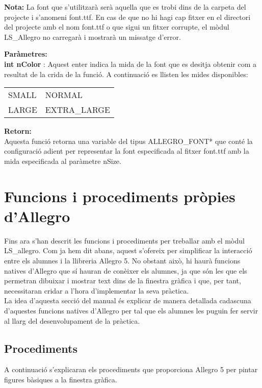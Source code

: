 \documentclass[11pt]{article}
\begin{document}
\noindent \textbf{Nota:} La font que s'utilitzarà serà aquella que es trobi dins de la carpeta del projecte i s'anomeni font.ttf. En cas de que no hi hagi cap fitxer en el directori del projecte amb el nom font.ttf o que sigui un fitxer corrupte, el mòdul LS\_Allegro no carregarà i mostrarà un missatge d'error.
	
\noindent \textbf{Paràmetres:}\\
\textbf{int nColor} : Aquest enter indica la mida de la font que es desitja obtenir com a resultat de la crida de la funció. A continuació es llisten les mides disponibles:

\begin{center}
	\begin{tabular}{l|l}
		SMALL & NORMAL\\
		LARGE & EXTRA\_LARGE\\	
	\end{tabular}
\end{center}

\noindent \textbf{Retorn:}\\
Aquesta funció retorna una variable del tipus ALLEGRO\_FONT* que conté la configuració adient per representar la font especificada al fitxer font.ttf amb la mida especificada al paràmetre nSize.
   	
\newpage
\section{Funcions i procediments pròpies d'Allegro}
Fins ara s'han descrit les funcions i procediments per treballar amb el mòdul LS\_allegro. Com ja hem dit abans, aquest s'ofereix per simplificar la interacció entre els alumnes i la llibreria Allegro 5. No obstant això, hi haurà funcions natives d'Allegro que sí hauran de conèixer els alumnes, ja que són les que els permetran dibuixar i mostrar text dins de la finestra gràfica i que, per tant, necessitaran cridar a l'hora d'implementar la seva pràctica. \\

\noindent La idea d'aquesta secció del manual és explicar de manera detallada cadascuna d'aquestes funcions natives d'Allegro per tal que els alumnes les puguin fer servir al llarg del desenvolupament de la pràctica.
\subsection{Procediments}
A continuació s'explicaran els procediments que proporciona Allegro 5 per pintar figures bàsiques a la finestra gràfica.\\
\end{document}
